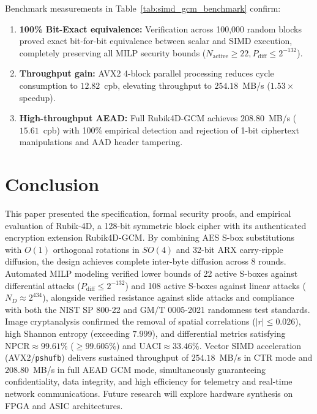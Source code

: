 \documentclass[10pt,twocolumn]{article}
\begin{document}
Benchmark measurements in Table~\ref{tab:simd_gcm_benchmark} confirm:
\begin{enumerate}
    \item \textbf{100\% Bit-Exact equivalence:} Verification across 100,000 random blocks proved exact bit-for-bit equivalence between scalar and SIMD execution, completely preserving all MILP security bounds ($N_{\text{active}} \ge 22, P_{\text{diff}} \le 2^{-132}$).
    \item \textbf{Throughput gain:} AVX2 4-block parallel processing reduces cycle consumption to $12.82$~cpb, elevating throughput to $254.18$~MB/s ($1.53\times$ speedup).
    \item \textbf{High-throughput AEAD:} Full Rubik4D-GCM achieves $208.80$~MB/s ($15.61$~cpb) with 100\% empirical detection and rejection of 1-bit ciphertext manipulations and AAD header tampering.
\end{enumerate}

\section{Conclusion}
\label{sec:conclusion}
This paper presented the specification, formal security proofs, and empirical evaluation of Rubik-4D, a 128-bit symmetric block cipher with its authenticated encryption extension Rubik4D-GCM. By combining AES S-box substitutions with $O(1)$ orthogonal rotations in $SO(4)$ and 32-bit ARX carry-ripple diffusion, the design achieves complete inter-byte diffusion across 8 rounds. Automated MILP modeling verified lower bounds of 22 active S-boxes against differential attacks ($P_{\text{diff}} \le 2^{-132}$) and 108 active S-boxes against linear attacks ($N_D \approx 2^{434}$), alongside verified resistance against slide attacks and compliance with both the NIST SP 800-22 and GM/T 0005-2021 randomness test standards. Image cryptanalysis confirmed the removal of spatial correlations ($|r| \le 0.026$), high Shannon entropy (exceeding $7.999$), and differential metrics satisfying $\text{NPCR} \approx 99.61\%$ ($\ge 99.605\%$) and $\text{UACI} \approx 33.46\%$. Vector SIMD acceleration (AVX2/\texttt{pshufb}) delivers sustained throughput of $254.18$~MB/s in CTR mode and $208.80$~MB/s in full AEAD GCM mode, simultaneously guaranteeing confidentiality, data integrity, and high efficiency for telemetry and real-time network communications. Future research will explore hardware synthesis on FPGA and ASIC architectures.
\end{document}
